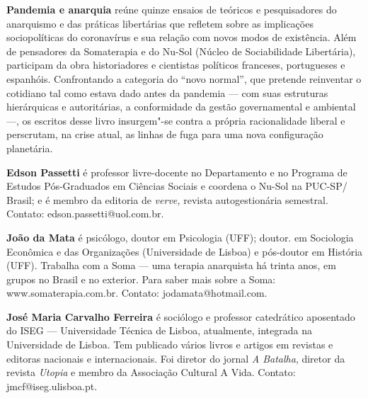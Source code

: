 
\textbf{Pandemia e anarquia} reúne quinze ensaios de teóricos e pesquisadores do anarquismo e das práticas libertárias que refletem sobre as implicações sociopolíticas do coronavírus e sua relação com novos modos de existência. Além de pensadores da Somaterapia e do Nu-Sol (Núcleo de Sociabilidade Libertária), participam da obra historiadores e cientistas políticos franceses, portugueses e espanhóis. Confrontando a categoria do ``novo normal'', que pretende reinventar o cotidiano tal como estava dado antes da pandemia --- com suas estruturas hierárquicas e autoritárias, a conformidade da gestão governamental e ambiental ---, os escritos desse livro insurgem"-se contra a própria racionalidade liberal e perscrutam, na crise atual, as linhas de fuga para uma nova configuração planetária.


\textbf{Edson Passetti} é professor livre-docente no Departamento e no
Programa de Estudos Pós-Graduados em Ciências Sociais e coordena o
Nu-Sol na PUC-SP/ Brasil; e é membro da editoria de \emph{verve,} revista autogestionária semestral. Contato: edson.passetti@uol.com.br.

\textbf{João da Mata} é psicólogo, doutor em Psicologia (UFF); doutor.
em Sociologia Econômica e das Organizações (Universidade de Lisboa) e
pós-doutor em História (UFF). Trabalha com a Soma --- uma terapia
anarquista há trinta anos, em grupos no Brasil e no exterior. Para saber
mais sobre a Soma:
www.somaterapia.com.br. Contato:
jodamata@hotmail.com.

\textbf{José Maria Carvalho Ferreira} é sociólogo e professor
catedrático aposentado do ISEG --- Universidade Técnica de Lisboa,
atualmente, integrada na Universidade de Lisboa. Tem publicado vários
livros e artigos em revistas e editoras nacionais e internacionais. Foi
diretor do jornal \emph{A Batalha}, diretor da revista \emph{Utopia} e
membro da Associação Cultural A Vida. Contato:
jmcf@iseg.ulisboa.pt.


